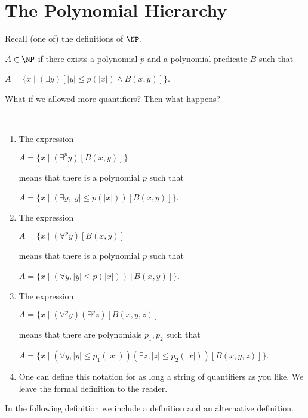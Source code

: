 \documentclass[12pt]{article}
\begin{document}
\section{The Polynomial Hierarchy}

Recall (one of) the definitions of $\NP$.

\begin{definition}
$A\in \NP$ if there exists a polynomial $p$ and a
polynomial predicate $B$ such that

$A=\{ x \mid (\exists y)[ |y|\le p(|x|) \wedge B(x,y)] \}$.

\end{definition}

What if we allowed more quantifiers?
Then what happens?

\begin{notation}~
\begin{enumerate}
\item
The expression

$A=\{ x \mid (\exists^p y)[ B(x,y) ]\}$

means that there is a polynomial $p$ such that

$A=\{ x \mid (\exists y, |y|\le p(|x|)) [ B(x,y)] \}$.

\item
The expression

$A=\{ x \mid (\forall^p y)[ B(x,y) ]$

means that there is a polynomial $p$ such that

$A=\{ x \mid (\forall y, |y|\le p(|x|))[B(x,y)] \}$.

\item
The expression

$A=\{ x \mid (\forall^p y)(\exists^p z)[ B(x,y,z) ]$

means that there are polynomials $p_1,p_2$ such that

$A=\{ x \mid (\forall y, |y|\le p_1(|x|))(\exists z, |z|\le p_2(|x|))[ B(x,y,z)] \}$.

\item
One can define this notation for as long a string of quantifiers
as you like.
We leave the formal definition to the reader.
\end{enumerate}

\end{notation}

In the following definition we 
include a definition and an alternative definition.
\end{document}
